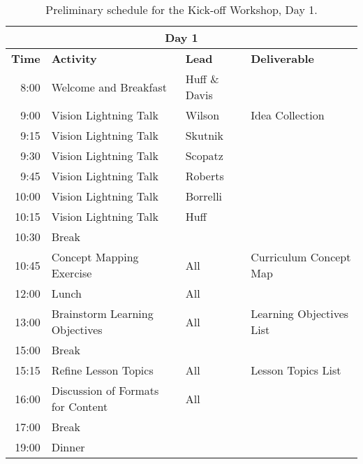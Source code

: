 \documentclass[11pt]{article}
\begin{document}
          
          \begin{table}[h!]
                  \centering
          \begin{tabularx}{\textwidth}{|r|l|l|X|}
                                  \multicolumn{4}{c}{\textbf{Day 1}}\\
                                  \hline
                          \textbf{Time}& \textbf{Activity}& \textbf{Lead}& \textbf{Deliverable}\\
                                  \hline
8:00& Welcome and Breakfast& Huff \& Davis& \\
9:00& Vision Lightning Talk& Wilson& Idea Collection\\
9:15& Vision Lightning Talk& Skutnik& \\
9:30& Vision Lightning Talk& Scopatz& \\
9:45& Vision Lightning Talk& Roberts& \\
10:00& Vision Lightning Talk& Borrelli& \\
10:15& Vision Lightning Talk& Huff& \\
10:30& Break&&  \\
10:45& Concept Mapping Exercise& All& Curriculum Concept Map\\
12:00& Lunch& All& \\
13:00& Brainstorm Learning Objectives& All& Learning Objectives List\\
15:00& Break&&  \\
15:15& Refine Lesson Topics& All& Lesson Topics List\\
16:00& Discussion of Formats for Content& All&  \\
17:00& Break&&  \\
19:00& Dinner&&  \\
\hline
          \end{tabularx}
                  \caption{Preliminary schedule for the Kick-off Workshop, Day 
                  1.}
                  \label{tab:kickoff1}
  \end{table}
\end{document}
